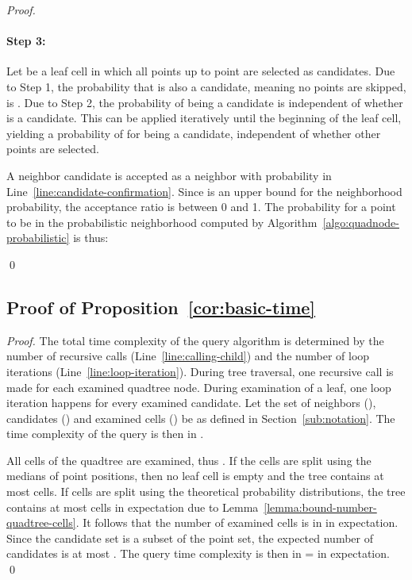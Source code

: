\documentclass{llncs}
\begin{document}
\begin{proof}
\paragraph{Step 3:}
Let  be a leaf cell in which all points up to point  are selected as candidates.
Due to Step 1, the probability that  is also a candidate, meaning no points are skipped, is .
Due to Step 2, the probability of  being a candidate is independent of whether  is a candidate.
This can be applied iteratively until the beginning of the leaf cell, yielding a probability of  for  being a candidate, independent of whether other points are selected.

A neighbor candidate  is accepted as a neighbor with probability  in Line~\ref{line:candidate-confirmation}.
Since  is an upper bound for the neighborhood probability, the acceptance ratio is between 0 and 1.
The probability for a point  to be in the probabilistic neighborhood computed by Algorithm~\ref{algo:quadnode-probabilistic} is thus:

\qed
\end{proof}


\subsection{Proof of Proposition~\ref{cor:basic-time}}
\label{sec:proof-cor-basic-time}
\begin{proof}
The total time complexity of the query algorithm is determined by the number of recursive calls (Line~\ref{line:calling-child}) and the number of loop iterations (Line~\ref{line:loop-iteration}).
During tree traversal, one recursive call is made for each examined quadtree node.
During examination of a leaf, one loop iteration happens for every examined candidate.
Let the set of neighbors (), candidates () and examined cells () be as defined in Section~\ref{sub:notation}.
The time complexity of the query is then in .

All cells of the quadtree are examined, thus .
If the cells are split using the medians of point positions, then no leaf cell is empty and the tree contains at most  cells.
If cells are split using the theoretical probability distributions, the tree contains at most  cells in expectation due to Lemma~\ref{lemma:bound-number-quadtree-cells}.
It follows that the number of examined cells is in  in expectation.
Since the candidate set is a subset of the point set, the expected number of candidates is at most .
The query time complexity is then in  =  in expectation.
\qed
\end{proof}
\end{document}
